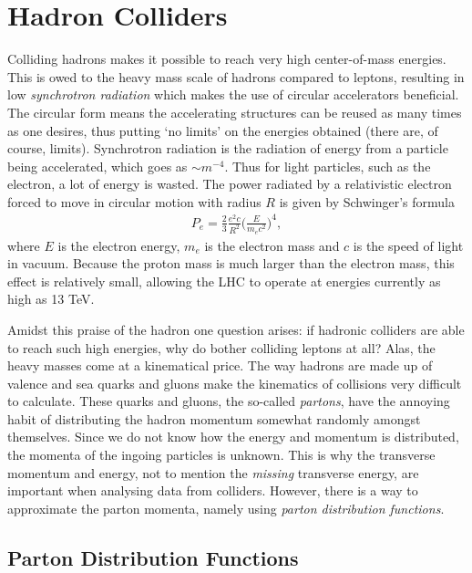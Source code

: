 \documentclass[twoside,english]{uiofysmaster}
\begin{document}
\section{Hadron Colliders}

Colliding hadrons makes it possible to reach very high center-of-mass energies. This is owed to the heavy mass scale of hadrons compared to leptons, resulting in low \textit{synchrotron radiation} which makes the use of circular accelerators beneficial. The circular form means the accelerating structures can be reused as many times as one desires, thus putting `no limits' on the energies obtained (there are, of course, limits). Synchrotron radiation is the radiation of energy from a particle being accelerated, which goes as $\sim m^{-4}$. Thus for light particles, such as the electron, a lot of energy is wasted. The power radiated by a relativistic electron forced to move in circular motion with radius $R$ is given by Schwinger's formula \cite{Balerna2015}
\begin{align}
P_e = \frac{2}{3} \frac{e^2 c}{R^2} \Bigg( \frac{E}{m_e c^2} \Bigg)^4,
\end{align}
where $E$ is the electron energy, $m_e$ is the electron mass and $c$ is the speed of light in vacuum. Because the proton mass is much larger than the electron mass, this effect is relatively small, allowing the LHC to operate at energies currently as high as 13 TeV. 

Amidst this praise of the hadron one question arises: if hadronic colliders are able to reach such high energies, why do bother colliding leptons at all? Alas, the heavy masses come at a kinematical price. The way hadrons are made up of valence and sea quarks and gluons make the kinematics of collisions very difficult to calculate. These quarks and gluons, the so-called \textit{partons}, have the annoying habit of distributing the hadron momentum somewhat randomly amongst themselves. Since we do not know how the energy and momentum is distributed, the momenta of the ingoing particles is unknown. This is why the transverse momentum and energy, not to mention the \textit{missing} transverse energy, are important when analysing data from colliders. However, there is a way to approximate the parton momenta, namely using \textit{parton distribution functions}.

\subsection{Parton Distribution Functions}
\end{document}
